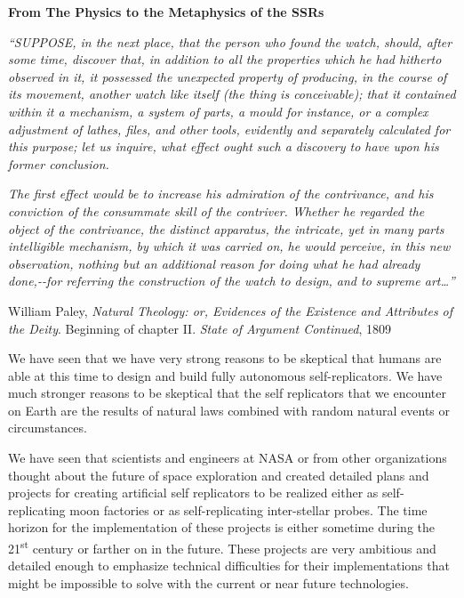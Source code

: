 \documentclass[letterpaper]{article}
\newcommand\textstyleauthori[1]{#1}
\begin{document}
\bigskip

{\bfseries
\hypertarget{RefHeading3166306210128}{}From The Physics to the
Metaphysics of the SSRs}

\textit{“SUPPOSE, in the next place, that the person who found the
watch, should, after some time, discover that, in addition to all the
properties which he had hitherto observed in it, it possessed the
unexpected property of producing, in the course of its movement,
another watch like itself (the thing is conceivable); that it contained
within it a mechanism, a system of parts, a mould for instance, or a
complex adjustment of lathes, files, and other tools, evidently and
separately calculated for this purpose; let us inquire, what effect
ought such a discovery to have upon his former conclusion.}

\textit{The first effect would be to increase his admiration of the
contrivance, and his conviction of the consummate skill of the
contriver. Whether he regarded the object of the contrivance, the
distinct apparatus, the intricate, yet in many parts intelligible
mechanism, by which it was carried on, he would perceive, in this new
observation, nothing but an additional reason for doing what he had
already done,-{}-for referring the construction of the watch to design,
and to supreme art…”}

William Paley, \textit{Natural Theology: or, Evidences of the Existence
and Attributes of the Deity}. Beginning of chapter II. \textit{State of
Argument Continued}\textstyleauthori{, 1809}


\bigskip


\bigskip

We have seen that we have very strong reasons to be skeptical that
humans are able at this time to design and build fully autonomous
self-replicators. We have much stronger reasons to be skeptical that
the self replicators that we encounter on Earth are the results of
natural laws combined with random natural events or circumstances.


\bigskip

We have seen that scientists and engineers at NASA or from other
organizations thought about the future of space exploration and created
detailed plans and projects for creating artificial self replicators to
be realized either as self-replicating moon factories or as
self-replicating inter-stellar probes.  The time horizon for the
implementation of these projects is either sometime during the
21\textsuperscript{st} century or farther on in the future. These
projects are very ambitious and detailed enough to emphasize technical
difficulties for their implementations that might be impossible to
solve with the current or near future technologies.
\end{document}
